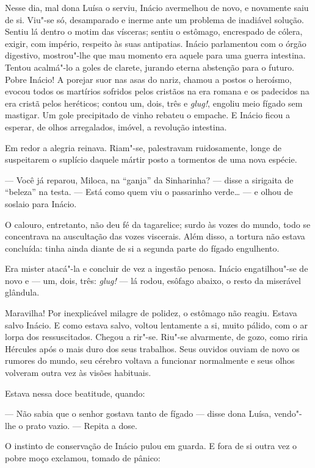 Nesse dia, mal dona Luísa o serviu, Inácio avermelhou de novo, e
novamente saiu de si. Viu"-se só, desamparado e inerme ante um problema
de inadiável solução. Sentiu lá dentro o motim das vísceras; sentiu o
estômago, encrespado de cólera, exigir, com império, respeito às suas
antipatias. Inácio parlamentou com o órgão digestivo, mostrou"-lhe que
mau momento era aquele para uma guerra intestina. Tentou acalmá"-lo a
goles de clarete, jurando eterna abstenção para o futuro. Pobre Inácio!
A porejar suor nas asas do nariz, chamou a postos o heroísmo, evocou
todos os martírios sofridos pelos cristãos na era romana e os padecidos
na era cristã pelos heréticos; contou um, dois, três e \emph{glug!},
engoliu meio fígado sem mastigar. Um gole precipitado de vinho rebateu o
empache. E Inácio ficou a esperar, de olhos arregalados, imóvel, a
revolução intestina.

Em redor a alegria reinava. Riam"-se, palestravam ruidosamente, longe de
suspeitarem o suplício daquele mártir posto a tormentos de uma nova
espécie.

--- Você já reparou, Miloca, na ``ganja'' da Sinharinha? --- disse a
sirigaita de ``beleza'' na testa. --- Está como quem viu o passarinho
verde\ldots{} --- e olhou de soslaio para Inácio.

O calouro, entretanto, não deu fé da tagarelice; surdo às vozes do
mundo, todo se concentrava na auscultação das vozes viscerais. Além
disso, a tortura não estava concluída: tinha ainda diante de si a
segunda parte do fígado engulhento.

Era mister atacá"-la e concluir de vez a ingestão penosa. Inácio
engatilhou"-se de novo e --- um, dois, três: \emph{glug!} --- lá rodou,
esôfago abaixo, o resto da miserável glândula.

Maravilha! Por inexplicável milagre de polidez, o estômago não reagiu.
Estava salvo Inácio. E como estava salvo, voltou lentamente a si, muito
pálido, com o ar lorpa dos ressuscitados. Chegou a rir"-se. Riu"-se
alvarmente, de gozo, como riria Hércules após o mais duro dos seus
trabalhos. Seus ouvidos ouviam de novo os rumores do mundo, seu cérebro
voltava a funcionar normalmente e seus olhos volveram outra vez às
visões habituais.

Estava nessa doce beatitude, quando:

--- Não sabia que o senhor gostava tanto de fígado --- disse dona Luísa,
vendo"-lhe o prato vazio. --- Repita a dose.

O instinto de conservação de Inácio pulou em guarda. E fora de si outra
vez o pobre moço exclamou, tomado de pânico:

